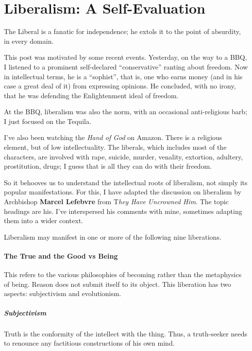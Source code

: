 \section{Liberalism: A Self-Evaluation}

\begin{quotex}
The Liberal is a fanatic for independence; he extols it to the point of absurdity, in every domain.
\end{quotex}

This post was motivated by some recent events. Yesterday, on the way to a BBQ, I listened to a prominent self-declared ``conservative'' ranting about freedom. Now in intellectual terms, he is a ``sophist'', that is, one who earns money (and in his case a great deal of it) from expressing opinions. He concluded, with no irony, that he was defending the Enlightenment ideal of freedom.

At the BBQ, liberalism was also the norm, with an occasional anti-religious barb; I just focused on the Tequila.

I've also been watching the \emph{Hand of God} on Amazon. There is a religious element, but of low intellectuality. The liberals, which includes most of the characters, are involved with rape, suicide, murder, venality, extortion, adultery, prostitution, drugs; I guess that is all they can do with their freedom.

So it behooves us to understand the intellectual roots of liberalism, not simply its popular manifestations. For this, I have adapted the discussion on liberalism by Archbishop \textbf{Marcel Lefebvre} from T\emph{hey Have Uncrowned Him}. The topic headings are his. I've interspersed his comments with mine, sometimes adapting them into a wider context.

Liberalism may manifest in one or more of the following nine liberations.

\paragraph{The True and the Good vs Being}


This refers to the various philosophies of becoming rather than the metaphysics of being. Reason does not submit itself to its object. This liberation has two aspects: subjectivism and evolutionism.

\subparagraph{Subjectivism}


Truth is the conformity of the intellect with the thing. Thus, a truth-seeker needs to renounce any factitious constructions of his own mind.

